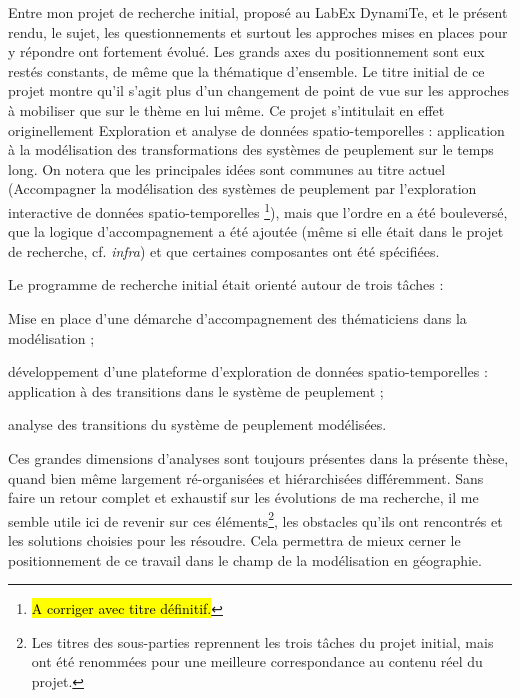 Entre mon projet de recherche initial, proposé au LabEx DynamiTe, et le présent rendu, le sujet, les questionnements et surtout les approches mises en places pour y répondre ont fortement évolué.
Les grands axes du positionnement sont eux restés constants, de même que la thématique d'ensemble.
Le titre initial de ce projet montre qu'il s'agit plus d'un changement de point de vue sur les approches à mobiliser que sur le thème en lui même.
Ce projet s'intitulait en effet originellement \og Exploration et analyse de données spatio-temporelles : application à la modélisation des transformations des systèmes de peuplement sur le temps long\fg{}.
On notera que les principales idées sont communes au titre actuel (\og Accompagner la modélisation des systèmes de peuplement par l'exploration interactive de données spatio-temporelles \fg{}\footnote{
	\hl{A corriger avec titre définitif.}
}), mais que l'ordre en a été bouleversé, que la logique d'accompagnement a été ajoutée (même si elle était dans le projet de recherche, cf. \textit{infra}) et que certaines composantes ont été spécifiées.

Le programme de recherche initial était orienté autour de trois tâches :

\begin{compactenum}\vspace*{-.5em}
	\item \og Mise en place d'une démarche d'accompagnement des thématiciens dans la modélisation\fg{} ;
	\item \og développement d'une plateforme d'exploration de données spatio-temporelles : application à des transitions dans le système de peuplement\fg{} ;
	\item \og analyse des transitions du système de peuplement modélisées\fg{}.
\end{compactenum}\vspace*{-.5em}

Ces grandes dimensions d'analyses sont toujours présentes dans la présente thèse, quand bien même largement ré-organisées et hiérarchisées différemment.
Sans faire un retour complet et exhaustif sur les évolutions de ma recherche, il me semble utile ici de revenir sur ces éléments\footnote{
	Les titres des sous-parties reprennent les trois tâches du projet initial, mais ont été renommées pour une meilleure correspondance au contenu réel du projet.
}, les obstacles qu'ils ont rencontrés et les solutions choisies pour les résoudre.
Cela permettra de mieux cerner le positionnement de ce travail dans le champ de la modélisation en géographie.



